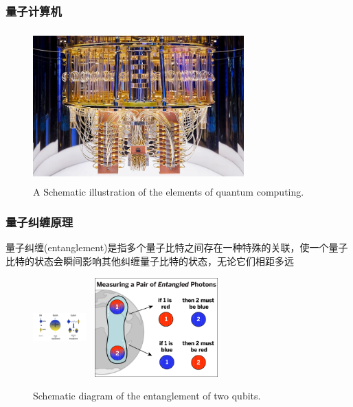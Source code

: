 \begin{frame}
	\frametitle{量子计算机}
            \begin{figure}
        \centering
                \includegraphics[height=2.3in, width=3.2in, viewport=0 0 767 511,clip]{Figures/Quantum_Computing.jpg}
		\caption{\tiny{\textrm{A Schematic illustration of the elements of quantum computing.}}}
		\label{Fig:Quantum_Computing}
            \end{figure}
\end{frame}

\begin{frame}
    \frametitle{量子纠缠原理}
    量子纠缠\textrm{(entanglement)}是指多个量子比特之间存在一种特殊的关联，使一个量子比特的状态会瞬间影响其他纠缠量子比特的状态，无论它们相距多远
            \begin{figure}
        \centering
                \includegraphics[height=1.5in, width=0.8in, viewport=460 0 645 380,clip]{Figures/Illustration-of-a-bit_and_qubit.png}
                \includegraphics[height=1.5in, width=2.05in, viewport=0 0 980 775,clip]{Figures/Quantum_Entanglement_chart.png}
		\caption{\tiny{\textrm{Schematic diagram of the entanglement of two qubits.}}}
		\label{Fig:Illustration-of-a-qubit-entanglement}
            \end{figure}
	    \vskip -10pt
	    {\fontsize{7.5pt}{5.2pt}\selectfont{利用量子纠缠可以实现高效的信息传输和处理，是量子通信和量子计算的重要资源}}
\end{frame}

